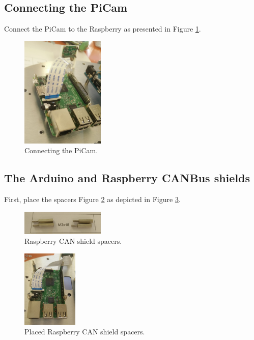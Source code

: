 \documentclass[10pt,a4paper]{report}   %
\begin{document}
\subsection{Connecting the PiCam}

Connect the PiCam to the Raspberry as presented in Figure \ref{fig:59}.

\begin{figure}[H]
\center
\includegraphics[width=150px]{images/59.jpg}
\caption{Connecting the PiCam.}
\label{fig:59}
\end{figure}

\subsection{The Arduino and Raspberry CANBus shields}

First, place the spacers Figure \ref{fig:61} as depicted in Figure \ref{fig:62}. 

\begin{figure}[H]
\center
\includegraphics[width=150px]{images/61.jpg}
\caption{Raspberry CAN shield spacers.}
\label{fig:61}
\end{figure}

\begin{figure}[H]
\center
\includegraphics[width=100px]{images/62.jpg}
\caption{Placed Raspberry CAN shield spacers.}
\label{fig:62}
\end{figure}
\end{document}

